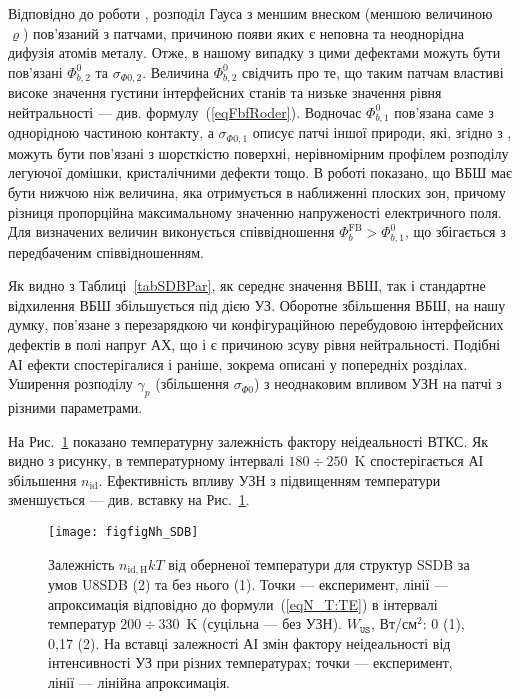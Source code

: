 \documentclass[a4paper,14pt,oneside,openany]{memoir}
\begin{document}
Відповідно до роботи \cite{Jiang:DGJap},
розподіл Гауса з меншим внеском (меншою величиною $\varrho$) пов'язаний з патчами, причиною появи яких є
неповна та неоднорідна дифузія атомів металу.
Отже, в нашому випадку з цими дефектами можуть бути пов'язані $\Phi_{b,2}^0$ та $\sigma_{\Phi0,2}$.
Величина $\Phi_{b,2}^0$ свідчить про те, що таким патчам властиві високе значення густини інтерфейсних станів та низьке значення рівня нейтральності --- див. формулу~(\ref{eqFbfRoder}).
Водночас $\Phi_{b,1}^0$ пов'язана саме з однорідною частиною контакту,
а $\sigma_{\Phi0,1}$ описує патчі іншої природи, які, згідно з \cite{Gammon2013}, можуть бути пов'язані з шорсткістю поверхні,
нерівномірним профілем розподілу легуючої домішки, кристалічними дефекти тощо.
В роботі \cite{Rhoderick1988} показано, що ВБШ має бути нижчою ніж величина, яка отримується в наближенні плоских зон,
причому різниця пропорційна максимальному значенню напруженості електричного поля.
Для визначених величин виконується співвідношення $\Phi_{b}^\mathrm{FB}>\Phi_{b,1}^0$, що  збігається з передбаченим співвідношенням.

Як видно з Таблиці~\ref{tabSDBPar}, як середнє значення ВБШ, так і стандартне відхилення ВБШ збільшується під дією УЗ.
Оборотне збільшення ВБШ, на нашу думку, пов'язане з перезарядкою чи конфігураційною перебудовою інтерфейсних дефектів в полі напруг
АХ, що і є причиною зсуву рівня нейтральності.
Подібні АІ ефекти спостерігалися і раніше, зокрема описані у попередніх розділах.
Уширення розподілу $\gamma_p$ (збільшення $\sigma_{\Phi0}$) з неоднаковим впливом УЗН на патчі з різними параметрами.

На Рис.~\ref{figfigNh_SDB} показано температурну залежність фактору неідеальності ВТКС.
Як видно з рисунку, в температурному інтервалі $180\div250$~K спостерігається АІ збільшення $n_\mathrm{id}$.
Ефективність впливу УЗН з підвищенням температури зменшується --- див. вставку на Рис.~\ref{figfigNh_SDB}.

\begin{figure}
\center
\texttt{[image: figfigNh\_SDB]}
\caption{\label{figfigNh_SDB}
Залежність $n_\mathrm{id,H}kT$ від оберненої температури для структур SSDB за умов U8SDB (2) та без нього (1).
Точки --- експеримент, лінії --- апроксимація відповідно до формули~(\ref{eqN_T:TE}) в інтервалі
температур $200\div330$~K (суцільна --- без УЗН).
$W_\mathtt{US}$,  Вт/см$^2$: 0 (1), 0,17 (2).
На вставці залежності АІ змін фактору неідеальності від інтенсивності УЗ при різних температурах;
точки --- експеримент, лінії --- лінійна апроксимація.
}%
\end{figure}
\end{document}
